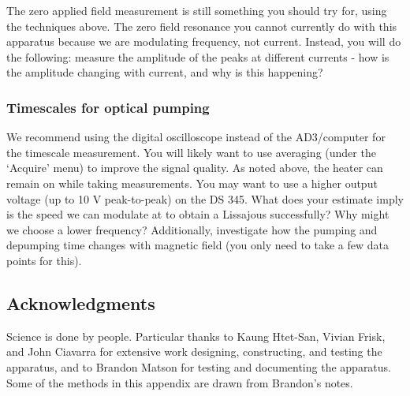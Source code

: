 \documentclass{../lab}
\begin{document}
The zero applied field measurement is still something you should try for, using the techniques above. The zero field resonance you cannot currently do with this apparatus because we are modulating frequency, not current. Instead, you will do the following: measure the amplitude of the peaks at different currents - how is the amplitude changing with current, and why is this happening?

\subsubsection{Timescales for optical pumping}

We recommend using the digital oscilloscope instead of the AD3/computer for the timescale measurement. You will likely want to use averaging (under the `Acquire' menu) to improve the signal quality. As noted above, the heater can remain on while taking measurements. You may want to use a higher output voltage (up to 10 V peak-to-peak) on the DS 345. What does your estimate imply is the speed we can modulate at to obtain a Lissajous successfully? Why might we choose a lower frequency? Additionally, investigate how the pumping and depumping time changes with magnetic field (you only need to take a few data points for this).

\subsection{Acknowledgments}

Science is done by people. Particular thanks to Kaung Htet-San, Vivian Frisk, and John Ciavarra for extensive work designing, constructing, and testing the apparatus, and to Brandon Matson for testing and documenting the apparatus. Some of the methods in this appendix are drawn from Brandon's notes.
\end{document}

